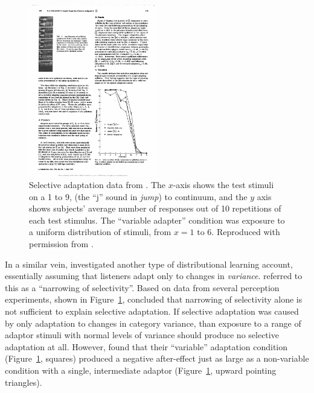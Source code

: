 \begin{figure}[!t]
  \centering
  \includegraphics[width=0.5\textwidth]{cole-cooper-1977-fig3.pdf}
  \caption{Selective adaptation data from \protect\textcite{Cole1977}.  The $x$-axis shows the test stimuli on a 1 to 9,  (the ``j'' sound in \emph{jump}) to  continuum, and the $y$ axis shows subjects' average number of  responses out of 10 repetitions of each test stimulus.  The ``variable adapter'' condition was exposure to a uniform distribution of stimuli, from $x=1$ to 6. Reproduced with permission from \protect\textcite{Cole1977}.}
  \label{fig:cole-1977-range-fixed-adaptors}
\end{figure}

In a similar vein, \textcite{Cole1977} investigated another type of distributional learning account, essentially assuming that listeners adapt only to changes in \emph{variance}. \citeauthor{Cole1977} referred to this as a ``narrowing of selectivity''. Based on data from several perception experiments, shown in Figure~\ref{fig:cole-1977-range-fixed-adaptors}, \citeauthor{Cole1977} concluded that narrowing of selectivity alone is not sufficient to explain selective adaptation.  If selective adaptation was caused by only adaptation to changes in category variance, than exposure to a range of adaptor stimuli with normal levels of variance should produce no selective adaptation at all.  However, \textcite{Cole1977} found that their ``variable'' adaptation condition (Figure~\ref{fig:cole-1977-range-fixed-adaptors}, squares) produced a negative after-effect just as large as a non-variable condition with a single, intermediate adaptor (Figure~\ref{fig:cole-1977-range-fixed-adaptors}, upward pointing triangles).

